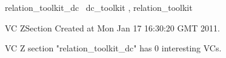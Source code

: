 \documentclass{article}
\begin{document}

\begin{zsection}
	 \SECTION relation\_toolkit\_dc \parents~dc\_toolkit , relation\_toolkit
\end{zsection}

\newcommand{\appliesTo}{\zbinop{appliesTo}} 
\newcommand{\appliesToNofix}{\zpreop{appliesToNofix}} 

VC ZSection Created at Mon Jan 17 16:30:20 GMT 2011.



 VC Z section "relation_toolkit_dc" has $0$ interesting VCs.



\end{document}
